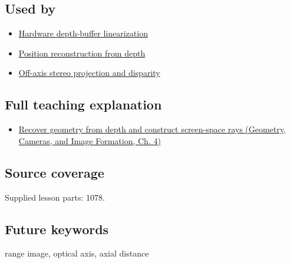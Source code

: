 \subsection{Used by}\label{appendix-cac01ebeeb11-used-by}

\hypertarget{appendix-cac01ebeeb11-used-by}{}

\begin{itemize}
\tightlist
\item
  \hyperref[appendix-1bc40b08db4a]{Hardware depth-buffer linearization}
\item
  \hyperref[appendix-2cbf2968e866]{Position reconstruction from depth}
\item
  \hyperref[appendix-0976e86e5b9f]{Off-axis stereo projection and disparity}
\end{itemize}

\subsection{Full teaching explanation}\label{appendix-cac01ebeeb11-full-teaching-explanation}

\hypertarget{appendix-cac01ebeeb11-full-teaching-explanation}{}

\begin{itemize}
\tightlist
\item
  \href{../03-Geometry-Cameras-and-Image-Formation/main.pdf\#nameddest=02-foundations-ii-ch035-recover-geometry-from-depth-and-construct-screen-space-rays}{Recover geometry from depth and construct screen-space rays (Geometry, Cameras, and Image Formation, Ch. 4)}
\end{itemize}

\subsection{Source coverage}\label{appendix-cac01ebeeb11-source-coverage}

\hypertarget{appendix-cac01ebeeb11-source-coverage}{}

Supplied lesson parts: 1078.

\subsection{Future keywords}\label{appendix-cac01ebeeb11-future-keywords}

\hypertarget{appendix-cac01ebeeb11-future-keywords}{}

range image, optical axis, axial distance
